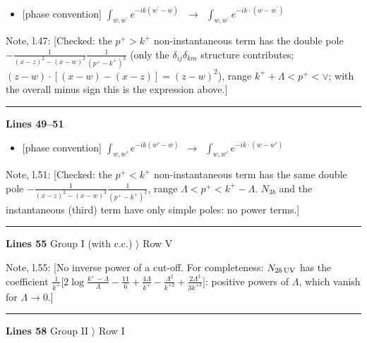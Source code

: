 \documentclass[10pt]{article}
\newenvironment{notebox}{\def\FrameCommand{{\color{notebar}\vrule width 1.5pt}\hspace{6pt}}\MakeFramed{\advance\hsize-\width\FrameRestore}\small}{\endMakeFramed}
\begin{document}
\begin{itemize}[leftmargin=2.2em,itemsep=1pt,topsep=2pt]
\item[\textbf{l.46}] \textsf{\small [phase convention]} $\displaystyle \int_{w, w^\prime} e^{-ik(w^\prime-w)}\,$\ $\longrightarrow$\ $\displaystyle \int_{w, w^\prime} e^{-ik\cdot(w-w^\prime)}\,$
\end{itemize}
\begin{notebox}\textsf{\small Note, l.47:} [Checked: the $p^{+}>k^{+}$ non-instantaneous term has the double pole $-\frac{1}{(x-z)^{2}-(x-w)^{2}}\frac{1}{(p^{+}-k^{+})^{2}}$ (only the $\delta_{ij}\delta_{km}$ structure contributes; $(z-w)\cdot[(x-w)-(x-z)]=(z-w)^{2}$), range $k^{+}+\Lambda<p^{+}<\vee$; with the overall minus sign this is the expression above.]\end{notebox}
\noindent\rule{\linewidth}{0.3pt}\par\noindent\textbf{Lines 49--51} \par
\begin{itemize}[leftmargin=2.2em,itemsep=1pt,topsep=2pt]
\item[\textbf{l.49}] \textsf{\small [phase convention]} $\displaystyle \int_{w,w'}e^{-ik(w'-w)}$\ $\longrightarrow$\ $\displaystyle \int_{w,w'}e^{-ik\cdot(w-w')}$
\end{itemize}
\begin{notebox}\textsf{\small Note, l.51:} [Checked: the $p^{+}<k^{+}$ non-instantaneous term has the same double pole $-\frac{1}{(x-z)^{2}-(x-w)^{2}}\frac{1}{(p^{+}-k^{+})^{2}}$, range $\Lambda<p^{+}<k^{+}-\Lambda$. $N_{3b}$ and the instantaneous (third) term have only simple poles: no power terms.]\end{notebox}
\noindent\rule{\linewidth}{0.3pt}\par\noindent\textbf{Lines 55} \quad \textsf{Group I (with c.c.) $\rangle$ Row V}\par
\begin{notebox}\textsf{\small Note, l.55:} [No inverse power of a cut-off. For completeness: $N_{2b\,\rm UV}$ has the coefficient $\frac{1}{k^{+}}\big[2\log\frac{k^{+}-\Lambda}{\Lambda}-\frac{11}{6}+\frac{4\Lambda}{k^{+}}-\frac{\Lambda^{2}}{k^{+2}}+\frac{2\Lambda^{3}}{3k^{+3}}\big]$: positive powers of $\Lambda$, which vanish for $\Lambda\to0$.]\end{notebox}
\noindent\rule{\linewidth}{0.3pt}\par\noindent\textbf{Lines 58} \quad \textsf{Group II $\rangle$ Row I}\par
\end{document}
